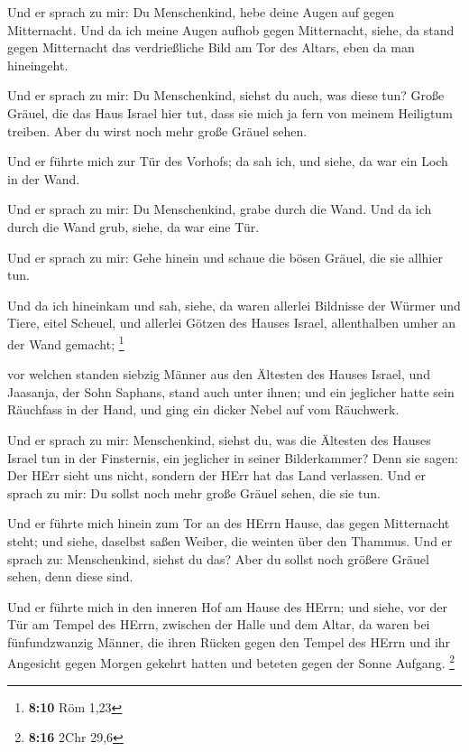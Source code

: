  Und er sprach zu mir: Du Menschenkind, hebe deine Augen auf
gegen Mitternacht. Und da ich meine Augen aufhob gegen Mitternacht,
siehe, da stand gegen Mitternacht das verdrießliche Bild am Tor des
Altars, eben da man hineingeht.

 Und er sprach zu mir: Du Menschenkind, siehst du auch, was
diese tun? Große Gräuel, die das Haus Israel hier tut, dass sie mich ja
fern von meinem Heiligtum treiben. Aber du wirst noch mehr große Gräuel
sehen.

 Und er führte mich zur Tür des Vorhofs; da sah ich, und
siehe, da war ein Loch in der Wand.

 Und er sprach zu mir: Du Menschenkind, grabe durch die
Wand. Und da ich durch die Wand grub, siehe, da war eine Tür.

 Und er sprach zu mir: Gehe hinein und schaue die bösen
Gräuel, die sie allhier tun.

 Und da ich hineinkam und sah, siehe, da waren allerlei
Bildnisse der Würmer und Tiere, eitel Scheuel, und allerlei Götzen des
Hauses Israel, allenthalben umher an der Wand gemacht; \footnote{\textbf{8:10}
  Röm 1,23}

 vor welchen standen siebzig Männer aus den Ältesten des
Hauses Israel, und Jaasanja, der Sohn Saphans, stand auch unter ihnen;
und ein jeglicher hatte sein Räuchfass in der Hand, und ging ein dicker
Nebel auf vom Räuchwerk.

 Und er sprach zu mir: Menschenkind, siehst du, was die
Ältesten des Hauses Israel tun in der Finsternis, ein jeglicher in
seiner Bilderkammer? Denn sie sagen: Der HErr sieht uns nicht, sondern
der HErr hat das Land verlassen.  Und er sprach zu mir: Du
sollst noch mehr große Gräuel sehen, die sie tun.

 Und er führte mich hinein zum Tor an des HErrn Hause, das
gegen Mitternacht steht; und siehe, daselbst saßen Weiber, die weinten
über den Thammus.  Und er sprach zu: Menschenkind, siehst
du das? Aber du sollst noch größere Gräuel sehen, denn diese sind.

 Und er führte mich in den inneren Hof am Hause des HErrn;
und siehe, vor der Tür am Tempel des HErrn, zwischen der Halle und dem
Altar, da waren bei fünfundzwanzig Männer, die ihren Rücken gegen den
Tempel des HErrn und ihr Angesicht gegen Morgen gekehrt hatten und
beteten gegen der Sonne Aufgang. \footnote{\textbf{8:16} 2Chr 29,6}

